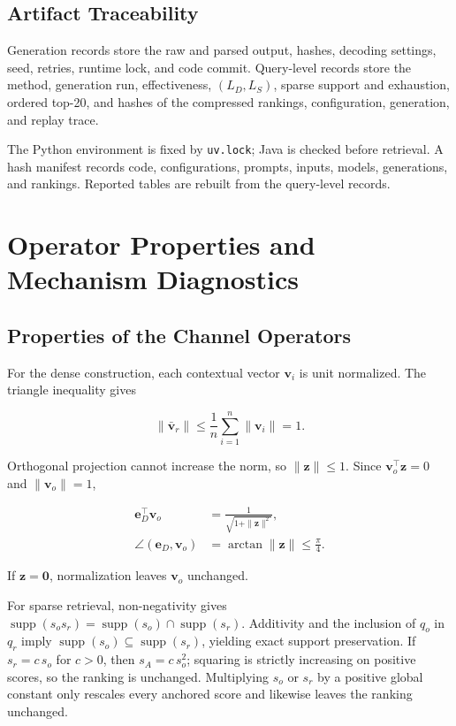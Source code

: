 \subsection{Artifact Traceability}

Generation records store the raw and parsed output, hashes, decoding settings,
seed, retries, runtime lock, and code commit. Query-level records store the
method, generation run, effectiveness, $(L_D,L_S)$, sparse support and
exhaustion, ordered top-20, and hashes of the compressed rankings,
configuration, generation, and replay trace.

The Python environment is fixed by \texttt{uv.lock}; Java is checked before
retrieval. A hash manifest records code, configurations, prompts, inputs,
models, generations, and rankings. Reported tables are rebuilt from the
query-level records.

\section{Operator Properties and Mechanism Diagnostics}
\label{sec:appendix-operators}

\subsection{Properties of the Channel Operators}

For the dense construction, each contextual vector $\mathbf v_i$ is unit
normalized. The triangle inequality gives

\[
\|\bar{\mathbf v}_r\|
\leq \frac{1}{n}\sum_{i=1}^{n}\|\mathbf v_i\|=1.
\]

Orthogonal projection cannot increase the norm, so
$\|\mathbf z\|\leq 1$. Since $\mathbf v_o^\top\mathbf z=0$ and
$\|\mathbf v_o\|=1$,

\[
\begin{aligned}
\mathbf e_D^\top\mathbf v_o
&=\frac{1}{\sqrt{1+\|\mathbf z\|^2}},\\
\angle(\mathbf e_D,\mathbf v_o)
&=\arctan\|\mathbf z\|\leq\frac{\pi}{4}.
\end{aligned}
\]

If $\mathbf z=\mathbf 0$, normalization leaves $\mathbf v_o$ unchanged.

For sparse retrieval, non-negativity gives
$\operatorname{supp}(s_os_r)=
\operatorname{supp}(s_o)\cap\operatorname{supp}(s_r)$. Additivity and the
inclusion of $q_o$ in $q_r$ imply
$\operatorname{supp}(s_o)\subseteq\operatorname{supp}(s_r)$, yielding exact
support preservation. If $s_r=c\,s_o$ for $c>0$, then
$s_A=c\,s_o^2$; squaring is strictly increasing on positive scores, so the
ranking is unchanged. Multiplying $s_o$ or $s_r$ by a positive global constant
only rescales every anchored score and likewise leaves the ranking unchanged.

